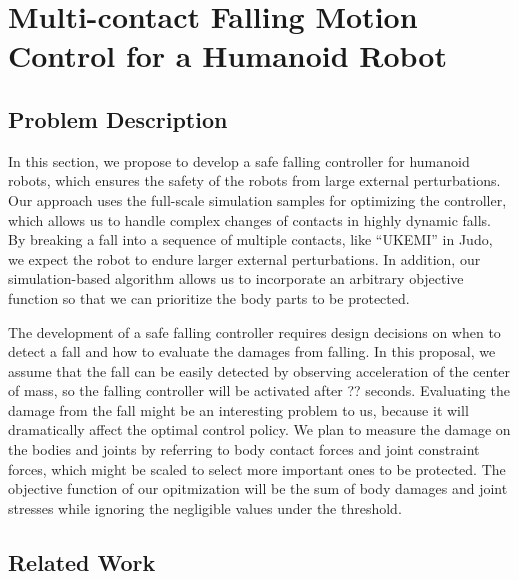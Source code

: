 \section{Multi-contact Falling Motion Control for a Humanoid Robot}

\subsection{Problem Description}

\indent

In this section, we propose to develop a safe falling controller for 
humanoid robots, which ensures the safety of the robots from 
large external perturbations.
Our approach uses the full-scale simulation samples for optimizing 
the controller, which allows us to handle complex changes of contacts 
in highly dynamic falls.
By breaking a fall into a sequence of multiple contacts, like ``UKEMI'' in Judo,
we expect the robot to endure larger external perturbations.
In addition, our simulation-based algorithm allows us to incorporate
an arbitrary objective function so that we can prioritize the body parts
to be protected.

The development of a safe falling controller requires design decisions
on when to detect a fall and how to evaluate the damages from falling.
In this proposal, we assume that the fall can be easily detected 
by observing acceleration of the center of mass, so the 
falling controller will be activated after ?? seconds.
Evaluating the damage from the fall might be an interesting problem
to us, because it will dramatically affect the optimal control policy.
We plan to measure the damage on the bodies and joints by referring
to body contact forces and joint constraint forces, which might be
scaled to select more important ones to be protected.
The objective function of our opitmization will be the sum of body
damages and joint stresses while ignoring the negligible values
under the threshold.

\subsection{Related Work}

\indent

